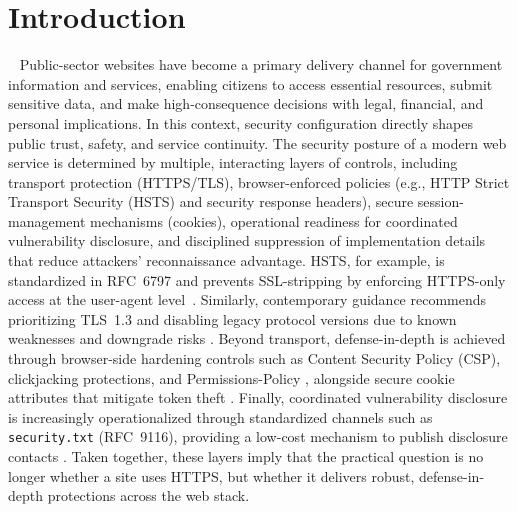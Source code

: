 \documentclass[a4paper,fleqn]{cas-sc}
\begin{document}
\section{Introduction}~\label{sec:introduction}
    Public-sector websites have become a primary delivery channel for government information and services, enabling citizens to access essential resources, submit sensitive data, and make high-consequence decisions with legal, financial, and personal implications.
    In this context, security configuration directly shapes public trust, safety, and service continuity.
    The security posture of a modern web service is determined by multiple, interacting layers of controls, including transport protection (HTTPS/TLS), browser-enforced policies (e.g., HTTP Strict Transport Security (HSTS) and security response headers), secure session-management mechanisms (cookies), operational readiness for coordinated vulnerability disclosure, and disciplined suppression of implementation details that reduce attackers' reconnaissance advantage.
    HSTS, for example, is standardized in RFC~6797 and prevents SSL-stripping by enforcing HTTPS-only access at the user-agent level~\cite{rfc6797,mdn_sts_header}. Similarly, contemporary guidance recommends prioritizing TLS~1.3 and disabling legacy protocol versions due to known weaknesses and downgrade risks \cite{rfc8446,rfc8996,nist_800_52r2,nsa_eliminating_obsolete_tls,cccs-itsp-40062}. Beyond transport, defense-in-depth is achieved through browser-side hardening controls such as Content Security Policy (CSP), clickjacking protections, and Permissions-Policy \cite{owasp_http_security_response_headers,owasp_csp_cheatsheet,mdn_csp_guide}, alongside secure cookie attributes that mitigate token theft \cite{mdn_secure_cookie_configuration,owasp_session_management_cookies}. Finally, coordinated vulnerability disclosure is increasingly operationalized through standardized channels such as \texttt{security.txt} (RFC~9116), providing a low-cost mechanism to publish disclosure contacts \cite{rfc9116,cisa_securitytxt_simple_file_big_value}. Taken together, these layers imply that the practical question is no longer whether a site uses HTTPS, but whether it delivers robust, defense-in-depth protections across the web stack. 
\end{document}
